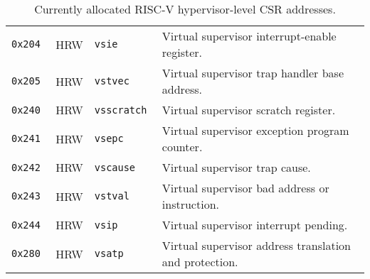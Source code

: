 \begin{table}[htb!]
\begin{center}
\begin{tabular}{|l|l|l|l|}
\tt 0x204 & HRW  &\tt vsie       & Virtual supervisor interrupt-enable register. \\
\tt 0x205 & HRW  &\tt vstvec     & Virtual supervisor trap handler base address. \\
\tt 0x240 & HRW  &\tt vsscratch  & Virtual supervisor scratch register. \\
\tt 0x241 & HRW  &\tt vsepc      & Virtual supervisor exception program counter. \\
\tt 0x242 & HRW  &\tt vscause    & Virtual supervisor trap cause. \\
\tt 0x243 & HRW  &\tt vstval     & Virtual supervisor bad address or instruction. \\
\tt 0x244 & HRW  &\tt vsip       & Virtual supervisor interrupt pending. \\
\tt 0x280 & HRW  &\tt vsatp      & Virtual supervisor address translation and protection. \\
\hline
\end{tabular}
\end{center}
\caption{Currently allocated RISC-V hypervisor-level CSR addresses.}
\label{hcsrnames}
\end{table}


